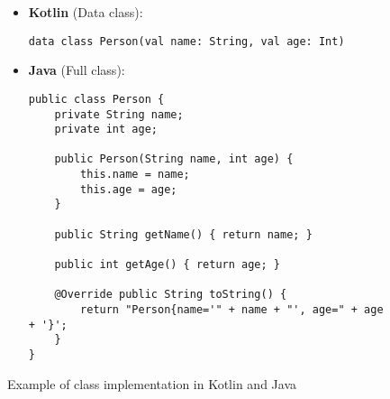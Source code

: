 \begin{figure}[H]
\centering
\begin{tcolorbox}[colframe=blue!80!black, colback=blue!5!white, coltitle=blue!50!black, title={-}, boxrule=0.5mm, width=0.8\textwidth, sharp corners=south]
    \begin{itemize}
    \vspace{0.2cm}
        \item \textbf{\scriptsize Kotlin} \scriptsize (Data class):
        \begin{lstlisting}[style=kotlin, basicstyle=\tiny\ttfamily]
data class Person(val name: String, val age: Int)
        \end{lstlisting}
        
        \item \textbf{\scriptsize Java} \scriptsize (Full class):
        \begin{lstlisting}[style=java, basicstyle=\tiny\ttfamily]
public class Person {
    private String name;
    private int age;

    public Person(String name, int age) {
        this.name = name;
        this.age = age;
    }

    public String getName() { return name; }

    public int getAge() { return age; }

    @Override public String toString() { 
        return "Person{name='" + name + "', age=" + age + '}'; 
    }
}
        \end{lstlisting}
    \end{itemize}
\end{tcolorbox}
\caption{Example of class implementation in Kotlin and Java}
\label{fig:class_implementation}
\end{figure}

\vspace{1cm}

